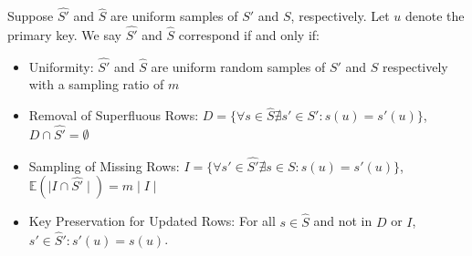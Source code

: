 \begin{property}[Correspondence]
Suppose $\widehat{S'}$ and $\widehat{S}$ are uniform samples of $S'$ and $S$, respectively.  Let $u$ denote the primary key. We say $\widehat{S'}$ and $\widehat{S}$ correspond if and only if:
\vspace{-.25em}
\begin{itemize}[noitemsep]
\item Uniformity: $\widehat{S'}$ and $\widehat{S}$ are uniform random samples of $S'$ and $S$ respectively with a sampling ratio of $m$
\item Removal of Superfluous Rows: $D = \{\forall s \in \widehat{S} \nexists s' \in S': s(u) = s'(u)\}$, $D \cap \widehat{S'} = \emptyset$ 
\item Sampling of Missing Rows: $I = \{\forall s' \in \widehat{S'} \nexists s \in S: s(u) = s'(u)\}$, $\mathbb{E}(\mid I \cap \widehat{S'} \mid) = m\mid I \mid $ 
\item Key Preservation for Updated Rows: For all $s\in \widehat{S}$ and not in $D$ or $I$, $s' \in \widehat{S}': s'(u) = s(u)$.
\end{itemize}
\vspace{-.25em}
\label{correspondence}
\end{property}






